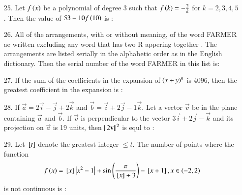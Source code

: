 \documentclass[journal,12pt,onecolumn]{IEEEtran}
\theoremstyle{remark}
\begin{document}
\begin{enumerate}
    \item[25.] Let $f\left(x\right)$  be a polynomial of degree 3 such that $f\left(k\right) = -\frac{2}{k}$ for $k = 2, 3, 4, 5$. Then the value of
        $53 - 10f\left(10\right)$ is :
        \hfill{}\\


    \item[26.] All of the arrangements, with or without meaning, of the word FARMER ae written excluding any word that has two R appering together . The arrangements
        are listed serially in the alphabetic order as in the English dictionary. Then the serial number of the word FARMER in this list is:
        \hfill{}\\


    \item[27.] If the sum of the coefficients in the expansion of $\left(x + y\right)^n$ is 4096, then the greatest coefficient in the expansion is :
        \hfill{}\\


    \item[28.] If $\vec{a} = 2\vec{i} - \vec{j} + 2\vec{k}$ and $\vec{b} = \vec{i} + 2\vec{j} - 1\vec{k}$. Let a vector $\vec{v}$ be in the plane containing
        $\vec{a}$ and $\vec{b}$. If $\vec{v}$ is perpendicular to the vector $3\vec{i} + 2\vec{j} - \vec{k}$ and its projection on $\vec{a}$ is 19 units, 
        then $\left\lVert2\mathbf{v}\right\rVert^2$ is equl to :
        \hfill{}\\


    \item[29.] Let ${}\left[t\right]$ denote the greatest integer $ \le t $. The number of points where the function
        \begin{align}
            f\left(x\right) = {}\left[x\right] \left\vert x^2 - 1\right\vert + \sin \left(\frac{\pi}{{}\left[x\right] + 3}\right) - {}\left[x + 1\right], x \in \left(-2, 2\right) 
        \end{align}
        is not continuous is :
        \hfill{}\\



\end{enumerate}
\end{document}
